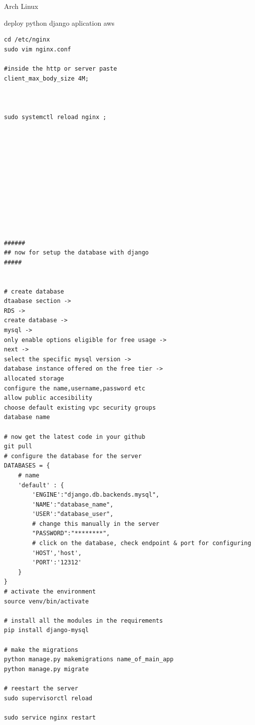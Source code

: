 \begin{section}{Arch Linux}
\begin{subsection}{deploy python django aplication aws}
\begin{verbatim}
cd /etc/nginx
sudo vim nginx.conf

#inside the http or server paste
client_max_body_size 4M;



sudo systemctl reload nginx ;












######
## now for setup the database with django
#####


# create database
dtaabase section ->
RDS ->
create database ->
mysql ->
only enable options eligible for free usage ->
next ->
select the specific mysql version ->
database instance offered on the free tier ->
allocated storage
configure the name,username,password etc
allow public accesibility
choose default existing vpc security groups
database name

# now get the latest code in your github
git pull
# configure the database for the server
DATABASES = {
	# name
	'default' : {
		'ENGINE':"django.db.backends.mysql",
		'NAME':"database_name",
		'USER':"database_user",
		# change this manually in the server
		"PASSWORD":"********",
		# click on the database, check endpoint & port for configuring
		'HOST','host',
		'PORT':'12312'
	}
}
# activate the environment
source venv/bin/activate

# install all the modules in the requirements
pip install django-mysql

# make the migrations
python manage.py makemigrations name_of_main_app
python manage.py migrate

# reestart the server
sudo supervisorctl reload

sudo service nginx restart






\end{verbatim}
\end{subsection}

\end{section}


